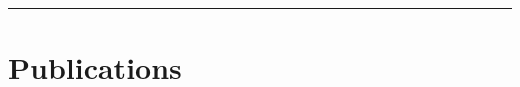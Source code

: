 \documentclass[letterpaper,12pt,oneside]{article}
\begin{document}
%
%
\noindent\rule{\textwidth}{1pt}
\vspace*{-2.5\baselineskip}
\section*{Publications}
\begin{spacing}{.9}	
	\begin{large}	
		
		\nocite{Munoz-Martin2023,Pradhan2023,Pradhan2021,Cooper2020,Stone2018,Pradhan2017}
		\renewcommand{\section}[2]{}%
		
	\end{large}
\end{spacing}
\end{document}
